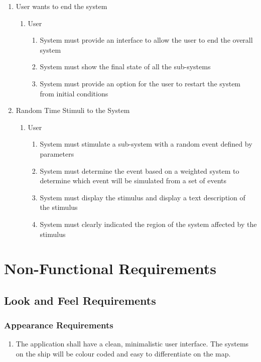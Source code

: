 \documentclass[12pt, titlepage]{article}
\begin{document}
\begin{enumerate}[{BE}1.]
	\item User wants to end the system
	\begin{enumerate}[{VP8}.1]
		\item User
			\begin{enumerate}
				\item System must provide an interface to allow the user to end the overall system
				\item System must show the final state of all the sub-systems
				\item System must provide an option for the user to restart the system from initial conditions
			\end{enumerate}
	\end{enumerate}
	
	\item Random Time Stimuli to the System
	\begin{enumerate}[{VP9}.1]
		\item User
			\begin{enumerate}
				\item System must stimulate a sub-system with a random event defined by parameters
				\item System must determine the event based on a weighted system to determine which event will be simulated from a set of events
				\item System must display the stimulus and display a text description of the stimulus
				\item System must clearly indicated the region of the system affected by the stimulus
			\end{enumerate}
	\end{enumerate}
	
	
\end{enumerate}



\section{Non-Functional Requirements}
\label{sec:non-functional_requirements}
\subsection{Look and Feel Requirements}
\label{sub:look_and_feel_requirements}

\subsubsection{Appearance Requirements}
\label{ssub:appearance_requirements}
\begin{enumerate}[{LF}1. ]
	\item The application shall have a clean, minimalistic user interface. The systems on the ship will be colour coded and easy to differentiate on the map.
\end{enumerate}
\end{document}
